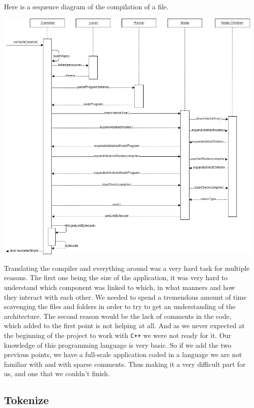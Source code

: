 \documentclass{scrbook}
\begin{document}
Here is a sequence diagram of the compilation of a file.

\begin{center}
  \includegraphics[width=\textwidth]{./compiler_sequence_diagram}
\end{center}

Translating the compiler and everything around was a very hard task for multiple reasons. The first one being the size of the application, it was very hard to understand which component was linked to which, in what manners and how they interact with each other. We needed to spend a tremendous amount of time scavenging the files and folders in order to try to get an understanding of the architecture.
The second reason would be the lack of comments in the code, which added to the first point is not helping at all. And as we never expected at the beginning of the project to work with \texttt{C++} we were not ready for it. Our knowledge of this programming language is very basic. So if we add the two previous points, we have a full-scale application coded in a language we are not familiar with and with sparse comments. 
Thus making it a very difficult part for us, and one that we couldn't finish. 

\subsection{Tokenize}
\end{document}
